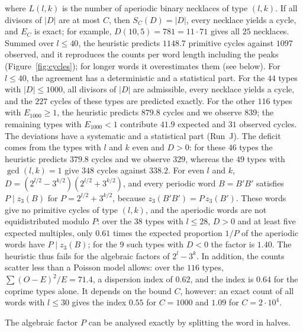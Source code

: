 \documentclass[12pt]{amsart}
\theoremstyle{definition}
\theoremstyle{remark}
\begin{document}
where $L(l,k)$ is the number of aperiodic binary necklaces of type $(l,k)$. If all divisors of $|D|$ are at most $C$, then $S_C(D)=|D|$, every necklace yields a cycle, and $E_C$ is exact; for example, $D(10,5)=781=11\cdot71$ gives all $25$ necklaces. Summed over $l\le40$, the heuristic predicts $1148.7$ primitive cycles against $1097$ observed, and it reproduces the counts per word length including the peaks (Figure~\ref{fig:cycles}); for longer words it overestimates them (see below). For $l\le40$, the agreement has a deterministic and a statistical part. For the $44$ types with $|D|\le1000$, all divisors of $|D|$ are admissible, every necklace yields a cycle, and the $227$ cycles of these types are predicted exactly. For the other $116$ types with $E_{1000}\ge1$, the heuristic predicts $879.8$ cycles and we observe $839$; the remaining types with $E_{1000}<1$ contribute $41.9$ expected and $31$ observed cycles. The deviations have a systematic and a statistical part (Run~J). The deficit comes from the types with $l$ and $k$ even and $D>0$: for these $46$ types the heuristic predicts $379.8$ cycles and we observe $329$, whereas the $49$ types with $\gcd(l,k)=1$ give $348$ cycles against $338.2$. For even $l$ and $k$, $D=(2^{l/2}-3^{k/2})(2^{l/2}+3^{k/2})$, and every periodic word $B=B'B'$ satisfies $P\mid z_3(B)$ for $P=2^{l/2}+3^{k/2}$, because $z_3(B'B')=P\,z_3(B')$. These words give no primitive cycles of type $(l,k)$, and the aperiodic words are not equidistributed modulo $P$: over the $38$ types with $l\le28$, $D>0$ and at least five expected multiples, only $0.61$ times the expected proportion $1/P$ of the aperiodic words have $P\mid z_3(B)$; for the $9$ such types with $D<0$ the factor is $1.40$. The heuristic thus fails for the algebraic factors of $2^l-3^k$. In addition, the counts scatter less than a Poisson model allows: over the $116$ types, $\sum(O-E)^2/E=71.4$, a dispersion index of $0.62$, and the index is $0.64$ for the coprime types alone. It depends on the bound $C$, however: an exact count of all words with $l\le30$ gives the index $0.55$ for $C=1000$ and $1.09$ for $C=2\cdot10^4$.

The algebraic factor $P$ can be analysed exactly by splitting the word in halves.
\end{document}
